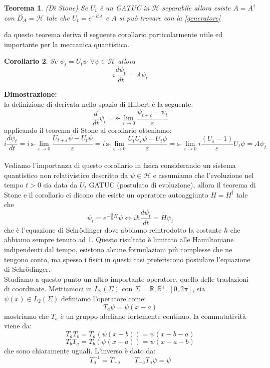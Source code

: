 \documentclass[12pt]{book}
\theoremstyle{plain}
\newcommand{\R}{\mathbb{R}}
\renewcommand{\H}{\mathcal{H}}
\newtheorem{thm}{Teorema}[section]
\newtheorem{coro}[thm]{Corollario}
\theoremstyle{definition}
\theoremstyle{remark}
\begin{document}
\begin{thm}(Di Stone)
Se $U_t$ è un GATUC in $\H$ separabile allora esiste $A=A^\dagger$ con $\overline{D_A} =\H $ tale che $U_t = e^{-itA}$ e $A$ si può trovare con la \eqref{generatore}
\end{thm}
da questo teorema deriva il seguente corollario particolarmente utile ed importante per la meccanica quantistica.
\begin{coro}
Se $\psi_t = U_t\psi$ $\forall \psi\in\H$ allora 
\[i\frac{d\psi_t}{dt} = A\psi_t\]
\end{coro}
\hspace{-1.6em}\textbf{Dimostrazione:}\\
la definizione di derivata nello spazio di Hilbert è la seguente:
\[\frac{d}{dt}\psi_t = \text{s-}\lim_{\varepsilon\to0} \frac{\psi_{t+\varepsilon} -\psi_t}{\varepsilon}\]
applicando il teorema di Stone al corollario otteniamo:
\[i\frac{d\psi_t}{dt}  = i\,\text{s-}\lim_{\varepsilon\to0} \frac{U_{t+\varepsilon}\psi -U_t\psi}{\varepsilon} = i\,\text{s-}\lim_{\varepsilon\to0} \frac{U_tU_\varepsilon\psi -U_t\psi}{\varepsilon} = \text{s-}\lim_{\varepsilon\to0} i \frac{(U_{\varepsilon} - 1)}{\varepsilon}U_t\psi = A\psi_t  \]
\\
Vediamo l'importanza di questo corollario in fisica considerando un sistema quantistico non relativistico descritto da $\psi\in\H$ e assumiamo che l'evoluzione nel tempo $t>0$ sia data da $U_t$ GATUC (postulato di evoluzione), allora il teorema di Stone e il corollario ci dicono che esiste un operatore autoaggiunto $H=H^\dagger$ tale che
\[\psi_t = e^{-\frac{it}{\hbar}H}\psi \iff i\hbar \frac{d\psi_t}{dt} = H\psi_t\]
che è l'equazione di Schr{\"o}dinger dove abbiamo reintrodotto la costante $\hbar$ che abbiamo sempre tenuto ad 1. Questo risultato è limitato alle Hamiltoniane indipendenti dal tempo, esistono alcune formulazioni più complesse che ne tengono conto, ma spesso i fisici in questi casi preferiscono postulare l'equazione di Schr{\"o}dinger.\\
\newline Studiamo a questo punto un altro importante operatore, quello delle traslazioni di coordinate. Mettiamoci in $L_2(\Sigma)$ con $\Sigma = \R,\R^+,[0,2\pi]$, sia $\psi(x)\in L_2(\Sigma)$ definiamo l'operatore come:
\[T_a\psi = \psi(x-a)\]
mostriamo che $T_a$ è un gruppo abeliano fortemente continuo, la commutatività viene da:
\[T_aT_b = T_a(\psi(x-b)) = \psi(x-b-a)\]
\[T_bT_a = T_b(\psi(x-a)) = \psi(x-a-b)\]
che sono chiaramente uguali. L'inverso è dato da:
\[T_a^{-1} = T_{-a} \qquad  T_{-a}T_a\psi = \psi  \]
\end{document}
